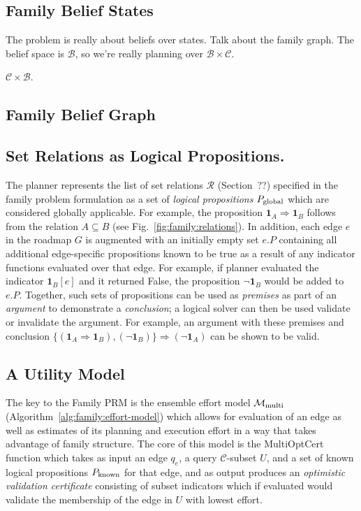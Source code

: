 \subsection{Family Belief States}

The problem is really about beliefs over states.
Talk about the family graph.
The belief space is $\mathcal{B}$,
so we're really planning over $\mathcal{B} \times \mathcal{C}$.

$\mathcal{C} \times \mathcal{B}$.

\subsection{Family Belief Graph}

\subsection{Set Relations as Logical Propositions.}
The planner represents the list of set relations $\mathcal{R}$
(Section~??)
specified in the family problem formulation
as a set of \emph{logical propositions} $P_{\mbox{\scriptsize global}}$
which are considered globally applicable.
For example,
the proposition $\mathbf{1}_A \Rightarrow \mathbf{1}_B$
follows from the relation $A \subseteq B$
(see Fig.~\ref{fig:family:relations}).
In addition,
each edge $e$ in the roadmap $G$ is augmented with an initially empty
set $e.P$ containing all additional edge-specific propositions
known to be true as a result of any indicator functions evaluated
over that edge.
For example,
if planner evaluated the indicator $\mathbf{1}_B[e]$
and it returned False,
the proposition $\lnot\mathbf{1}_B$ would be added to $e.P$.
Together, such sets of propositions can be used as \emph{premises}
as part of an \emph{argument} to demonstrate a \emph{conclusion};
a logical solver can then be used validate or invalidate the argument.
For example, an argument with these premises and conclusion
$\{ (\mathbf{1}_A \Rightarrow \mathbf{1}_B), (\lnot\mathbf{1}_B) \}
\Rightarrow (\lnot\mathbf{1}_A)$
can be shown to be valid.

\subsection{A Utility Model}

The key to the Family PRM is the ensemble effort model
$\mathcal{M}_{\mbox{\scriptsize multi}}$
(Algorithm~\ref{alg:family:effort-model})
which allows for evaluation of an edge
as well as estimates of its planning and execution effort
in a way that takes advantage of family structure.
The core of this model is the {\sc MultiOptCert} function
which takes as input an edge $q_e$,
a query $\mathcal{C}$-subset $U$,
and a set of known logical propositions $P_{\mbox{\scriptsize known}}$
for that edge,
and as output produces an \emph{optimistic validation certificate}
consisting of subset indicators which if evaluated would
validate the membership of the edge in $U$ with lowest effort.

